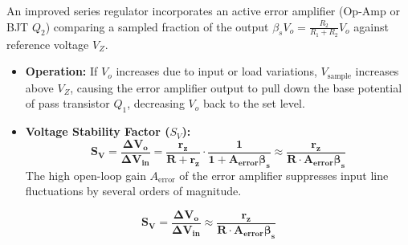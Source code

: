 \documentclass[11pt,a4paper,oneside]{book}
\begin{document}
An improved series regulator incorporates an active error amplifier (Op-Amp or BJT $Q_2$) comparing a sampled fraction of the output $\beta_s V_o = \frac{R_2}{R_1+R_2}V_o$ against reference voltage $V_Z$.
\begin{itemize}[leftmargin=1.5em]
  \item \textbf{Operation:} If $V_o$ increases due to input or load variations, $V_{\text{sample}}$ increases above $V_Z$, causing the error amplifier output to pull down the base potential of pass transistor $Q_1$, decreasing $V_o$ back to the set level.
  \item \textbf{Voltage Stability Factor ($S_V$):}
  \[
  \mathbf{S_V = \frac{\Delta V_o}{\Delta V_{\text{in}}} = \frac{r_z}{R + r_z} \cdot \frac{1}{1 + A_{\text{error}} \beta_s} \approx \frac{r_z}{R \cdot A_{\text{error}} \beta_s}}
  \]
  The high open-loop gain $A_{\text{error}}$ of the error amplifier suppresses input line fluctuations by several orders of magnitude.
\end{itemize}

\begin{answerbox}
$$\mathbf{S_V = \frac{\Delta V_o}{\Delta V_{\text{in}}} \approx \frac{r_z}{R \cdot A_{\text{error}} \beta_s}}$$
\end{answerbox}
\end{document}

